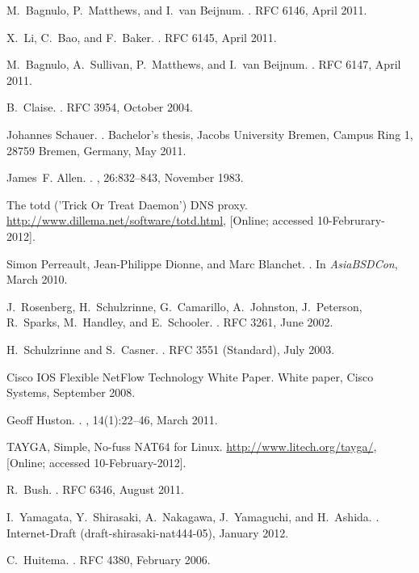 \documentclass{llncs}
\begin{document}
\begin{thebibliography}{10}
M.~Bagnulo, P.~Matthews, and I.~van Beijnum.
.
\newblock RFC 6146, April 2011.

X.~Li, C.~Bao, and F.~Baker.
.
\newblock RFC 6145, April 2011.

M.~Bagnulo, A.~Sullivan, P.~Matthews, and I.~van Beijnum.
.
\newblock RFC 6147, April 2011.

B.~Claise.
.
\newblock RFC 3954, October 2004.

Johannes Schauer.
.
\newblock Bachelor's thesis, Jacobs University Bremen, Campus Ring 1, 28759
  Bremen, Germany, May 2011.

James~F. Allen.
.
, 26:832--843, November 1983.

{{The totd ('Trick Or Treat Daemon') DNS proxy}}.
\newblock \url{http://www.dillema.net/software/totd.html}, [Online; accessed
  10-Februrary-2012].

Simon Perreault, Jean-Philippe Dionne, and Marc Blanchet.
.
\newblock In {\em AsiaBSDCon}, March 2010.

J.~Rosenberg, H.~Schulzrinne, G.~Camarillo, A.~Johnston, J.~Peterson,
  R.~Sparks, M.~Handley, and E.~Schooler.
.
\newblock RFC 3261, June 2002.

H.~Schulzrinne and S.~Casner.
.
\newblock RFC 3551 (Standard), July 2003.

{Cisco IOS Flexible NetFlow Technology White Paper}.
\newblock White paper, Cisco Systems, September 2008.

Geoff Huston.
.
, 14(1):22--46, March 2011.

{{TAYGA, Simple, No-fuss NAT64 for Linux}}.
\newblock \url{http://www.litech.org/tayga/}, [Online; accessed
  10-February-2012].

R.~Bush.
.
\newblock RFC 6346, August 2011.

I.~Yamagata, Y.~Shirasaki, A.~Nakagawa, J.~Yamaguchi, and H.~Ashida.
.
\newblock Internet-Draft (draft-shirasaki-nat444-05), January 2012.

C.~Huitema.
.
\newblock RFC 4380, February 2006.

\end{thebibliography}
\end{document}
